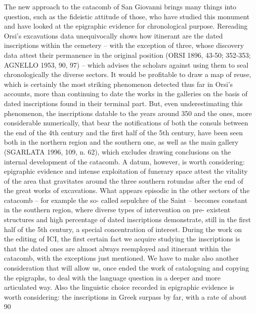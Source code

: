 \documentclass[amsthm,ebook]{saparticle}
\begin{document}
The new approach to the catacomb of San Giovanni brings many things into question, such as the fideistic attitude of those, who have studied this monument and have looked at the epigraphic evidence for chronological purpose. Rereading Orsi’s excavations data unequivocally shows how itinerant are the dated inscriptions within the cemetery – with the exception of three, whose discovery data attest their permanence in the original position (ORSI 1896, 43-50; 352-353; AGNELLO 1953, 90, 97) – which advises the scholars against using them to seal chronologically the diverse sectors. It would be profitable to draw a map of reuse, which is certainly the most striking phenomenon detected thus far in Orsi’s accounts, more than continuing to date the works in the galleries on the basis of dated inscriptions found in their terminal part. But, even underestimating this phenomenon, the inscriptions datable to the years around 350 and the ones, more considerable numerically, that bear the notifications of both the consuls between the end of the 4th century and the first half of the 5th century, have been seen both in the northern region and the southern one, as well as the main gallery (SGARLATA 1996, 109, n. 62), which excludes drawing conclusions on the internal development of the catacomb. A datum, however, is worth considering: epigraphic evidence and intense exploitation of funerary space attest the vitality of the area that gravitates around the three southern rotundas after the end of the great works of excavations. What appears episodic in the other sectors of the catacomb – for example the so- called sepulchre of the Saint – becomes constant in the southern region, where diverse types of intervention on pre- existent structures and high percentage of dated inscriptions demonstrate, still in the first half of the 5th century, a special concentration of interest. During the work on the editing of ICI, the first certain fact we acquire studying the inscriptions is that the dated ones are almost always reemployed and itinerant within the catacomb, with the exceptions just mentioned. We have to make also another consideration that will allow us, once ended the work of cataloguing and copying the epigraphs, to deal with the language question in a deeper and more articulated way. Also the linguistic choice recorded in epigraphic evidence is worth considering: the inscriptions in Greek surpass by far, with a rate of about 90%
\end{document}
